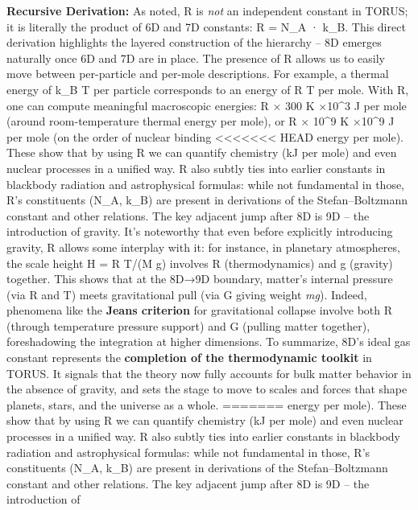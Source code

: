 \documentclass[]{article}
\begin{document}
\textbf{Recursive Derivation:} As noted, R is \emph{not} an independent
constant in TORUS; it is literally the product of 6D and 7D constants: R
= N\_A · k\_B​. This direct derivation highlights the layered
construction of the hierarchy -- 8D emerges naturally once 6D and 7D are
in place. The presence of R allows us to easily move between
per-particle and per-mole descriptions. For example, a thermal energy of
k\_B T per particle corresponds to an energy of R T per mole. With R,
one can compute meaningful macroscopic energies: R × 300 K ×10\^{}3
J per mole (around room-temperature thermal energy per mole), or R ×
10\^{}9 K ×10\^{}9 J per mole (on the order of nuclear binding
<<<<<<< HEAD
energy per mole)\hspace{0pt}. These show that by using R we can quantify
chemistry (kJ per mole) and even nuclear processes in a unified way. R
also subtly ties into earlier constants in blackbody radiation and
astrophysical formulas: while not fundamental in those, R's constituents
(N\_A, k\_B) are present in derivations of the Stefan--Boltzmann
constant and other relations\hspace{0pt}. The key adjacent jump after 8D
is 9D -- the introduction of gravity. It's noteworthy that even before
explicitly introducing gravity, R allows some interplay with it: for
instance, in planetary atmospheres, the scale height H = R T/(M g)
involves R (thermodynamics) and g (gravity) together\hspace{0pt}. This
shows that at the 8D→9D boundary, matter's internal pressure (via R and
T) meets gravitational pull (via G giving weight \emph{mg}). Indeed,
phenomena like the \textbf{Jeans criterion} for gravitational collapse
involve both R (through temperature pressure support) and G (pulling
matter together), foreshadowing the integration at higher dimensions. To
summarize, 8D's ideal gas constant represents the \textbf{completion of
the thermodynamic toolkit} in TORUS. It signals that the theory now
fully accounts for bulk matter behavior in the absence of gravity, and
sets the stage to move to scales and forces that shape planets, stars,
and the universe as a whole.
=======
energy per mole)​. These show that by using R we can quantify chemistry
(kJ per mole) and even nuclear processes in a unified way. R also subtly
ties into earlier constants in blackbody radiation and astrophysical
formulas: while not fundamental in those, R's constituents (N\_A, k\_B)
are present in derivations of the Stefan--Boltzmann constant and other
relations​. The key adjacent jump after 8D is 9D -- the introduction of
\end{document}
